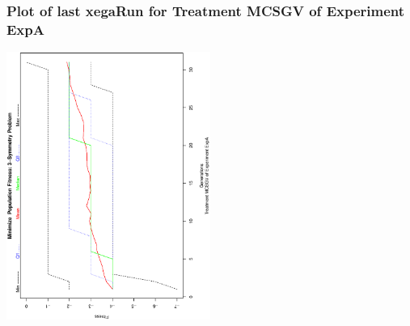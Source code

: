  \begin{frame}
 \frametitle{ Plot of last xegaRun for Treatment MCSGV of Experiment ExpA }
 \begin{center}
\includegraphics[width=0.5\textwidth, angle=-90]
{ExpAPlotPopStatsFigure002.eps}
 \end{center}
 \label{report/ExpAPlotPopStatsFigure002.eps}  
 \end{frame}

